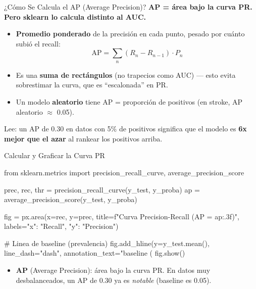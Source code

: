\documentclass[aspectratio=169, 11pt]{beamer}
\begin{document}
\begin{frame}[shrink=15]{¿Cómo Se Calcula el AP (Average Precision)?}
  \vspace{-4pt}
  {\footnotesize\color{arcaDark}\bfseries
    AP = área bajo la curva PR. Pero sklearn lo calcula \textbf{distinto} al AUC.}

  \vspace{6pt}
  {\footnotesize
  \begin{itemize}\setlength{\itemsep}{4pt}
    \item[{\color{arcaRed}\scriptsize\faArrowRight}]
      \textbf{Promedio ponderado} de la precisión en cada punto, pesado por
      cuánto subió el recall:
      $$\text{AP} = \sum_n (R_n - R_{n-1}) \cdot P_n$$
    \item[{\color{arcaRed}\scriptsize\faArrowRight}]
      Es una \textbf{suma de rectángulos} (no trapecios como AUC) --- esto
      evita sobrestimar la curva, que es ``escalonada'' en PR.
    \item[{\color{arcaRed}\scriptsize\faArrowRight}]
      Un modelo \textbf{aleatorio} tiene AP = proporción de positivos
      (en stroke, AP aleatorio $\approx$ 0.05).
  \end{itemize}
  }

  \vspace{4pt}
  \begin{tcolorbox}[colback=codeGreen!8, colframe=codeGreen, boxrule=0.5pt,
    arc=2pt, left=6pt, right=6pt, top=4pt, bottom=4pt]
    {\scriptsize\color{arcaDark}
    \faLightbulb\hspace{4pt} Lee: un AP de 0.30 en datos con 5\% de positivos
    significa que el modelo es \textbf{6x mejor que el azar} al rankear
    los positivos arriba.}
  \end{tcolorbox}
\end{frame}

\begin{frame}[fragile,shrink=18]{Calcular y Graficar la Curva PR}
  \vspace{-6pt}
  \begin{pyblock}
from sklearn.metrics import precision_recall_curve, average_precision_score

prec, rec, thr = precision_recall_curve(y_test, y_proba)
ap = average_precision_score(y_test, y_proba)

fig = px.area(x=rec, y=prec,
    title=f"Curva Precision-Recall (AP = {ap:.3f})",
    labels={"x": "Recall", "y": "Precision"})

# Linea de baseline (prevalencia)
fig.add_hline(y=y_test.mean(), line_dash="dash",
              annotation_text="baseline (%
fig.show()
  \end{pyblock}

  \vspace{4pt}
  {\scriptsize\color{textMuted}
  \begin{itemize}\setlength{\itemsep}{3pt}
    \item[{\color{arcaRed}\scriptsize\faArrowRight}]
      \textbf{AP} (Average Precision): área bajo la curva PR.
      En datos muy desbalanceados, un AP de 0.30 ya es \textit{notable}
      (baseline es 0.05).
  \end{itemize}
  }
\end{frame}
\end{document}
